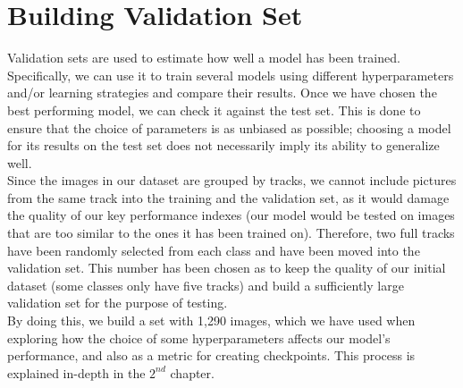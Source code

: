 \section{Building Validation Set}
Validation sets are used to estimate how well a model has been trained. Specifically, we can use it to train several models using different hyperparameters and/or learning strategies and compare their results. Once we have chosen the best performing model, we can check it against the test set. This is done to ensure that the choice of parameters is as unbiased as possible;  choosing a model for its results on the test set does not necessarily imply its ability to generalize well.\\
Since the images in our dataset are grouped by tracks, we cannot include pictures from the same track into the training and the validation set, as it would damage the quality of our key performance indexes (our model would be tested on images that are too similar to the ones it has been trained on). Therefore, two full tracks have been randomly selected from each class and have been moved into the validation set. This number has been chosen as to keep the quality of our initial dataset (some classes only have five tracks) and build a sufficiently large validation set for the purpose of testing. \\
By doing this, we build a set with 1,290 images, which we have used when exploring how the choice of some hyperparameters affects our model's performance, and also as a metric for creating checkpoints. This process is explained in-depth in the $2^{nd}$ chapter.

